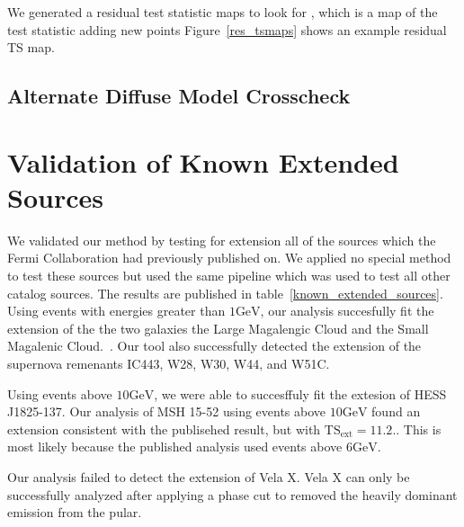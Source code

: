 \documentclass[preprint]{aastex}
\newcommand{\gev}{\text{GeV}\xspace}
\newcommand{\tsext}{{\ensuremath{\text{TS}_\text{ext}}}\xspace}
\begin{document}
We generated a residual test statistic maps to look for
, which is a map of the test
statistic adding new points
Figure~\ref{res_tsmaps} shows an example residual TS map.






\subsection{Alternate Diffuse Model Crosscheck}
\label{alt_diff_model_description}


\section{Validation of Known Extended Sources}
\label{validate_known}

We validated our method by testing for extension all of the sources
which the Fermi Collaboration had previously published on.  We applied
no special method to test these sources but used the same pipeline which
was used to test all other catalog sources.  The results are published
in table~\ref{known_extended_sources}.  Using events with energies
greater than $1\gev$, our analysis succesfully fit the extension of the
the two galaxies the Large Magalengic Cloud and the Small Magalenic
Cloud.~\cite{SMC & LMC Paper}.  Our tool also successfully detected the
extension of the supernova remenants IC443, W28, W30, W44, and W51C.

Using events above $10\gev$, we were able to succesffuly fit the extesion
of HESS J1825-137\cite{fermi_hess_j1825}. Our analysis of MSH 15-52 using
events above $10\gev$ found an extension consistent with the publisehed
result, but with $\tsext=11.2$.\cite{msh1552}. This
is most likely because the published analysis used events above $6\gev$.

Our analysis failed to detect the extension of Vela X. Vela X can only be
successfully analyzed after applying a phase cut to removed the heavily
dominant emission from the pular.
\end{document}
